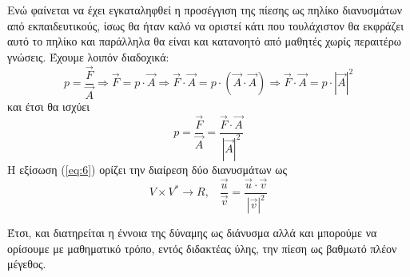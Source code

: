 \documentclass[12pt]{article}
\begin{document}
Ενώ φαίνεται να έχει εγκαταληφθεί η προσέγγιση της πίεσης ως πηλίκο διανυσμάτων από εκπαιδευτικούς, ίσως θα ήταν καλό να οριστεί κάτι που τουλάχιστον θα εκφράζει αυτό το πηλίκο και παράλληλα θα είναι και κατανοητό από μαθητές χωρίς περαιτέρω γνώσεις. Έχουμε λοιπόν διαδοχικά:
\begin{equation} \label{eq:5}
  p=\frac{\vec{F}}{\vec{A}} \Rightarrow \vec{F}=p\cdot \vec{A} \Rightarrow \vec{F}\cdot \vec{A}=p\cdot (\vec{A}\cdot \vec{A}) \Rightarrow \vec{F}\cdot \vec{A}= p\cdot\left| \vec{A} \right|^2
\end{equation}
και έτσι θα ισχύει
\begin{equation} \label{eq:6}
  p=\frac{\vec{F}}{\vec{A}}=\frac{\vec{F}\cdot\vec{A}}{\left| \vec{A} \right|^2}
\end{equation}
Η εξίσωση (\ref{eq:6}) ορίζει την διαίρεση δύο διανυσμάτων ως
\begin{equation} \label{eq:7}
  V\times V^* \to R \text{,}\quad \frac{\vec{u}}{\vec{v}}=\frac{\vec{u} \cdot \vec{v}}{|\vec{v}|^2}
\end{equation}

Έτσι, και διατηρείται η έννοια της δύναμης ως διάνυσμα αλλά και μπορούμε να ορίσουμε με μαθηματικό τρόπο, εντός διδακτέας ύλης, την πίεση ως βαθμωτό πλέον μέγεθος.
\end{document}
